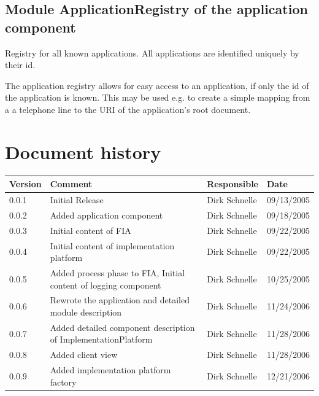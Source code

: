\documentclass[11pt,a4paper]{article}
\begin{document}
\subsection{Module ApplicationRegistry of the application component}

Registry for all known applications. All applications are identified
uniquely by their id.

The application registry allows for easy access to an application,
if only the id of the application is known. This may be used e.g. to
create a simple mapping from a a telephone line to the URI of the
application's root document.


\section*{Document history}

\begin{tabular}{|l|p{5cm}|l|l|}
\hline
\textbf{Version} & \textbf{Comment} & \textbf{Responsible} & \textbf{Date} \\
\hline
\hline
0.0.1 & Initial Release & Dirk Schnelle & 09/13/2005 \\
\hline
0.0.2 & Added application component & Dirk Schnelle & 09/18/2005 \\
\hline
0.0.3 & Initial content of FIA & Dirk Schnelle & 09/22/2005 \\
\hline
0.0.4 & Initial content of implementation platform & Dirk Schnelle & 09/22/2005 \\
\hline
0.0.5 & Added process phase to FIA, Initial content of logging component & 
Dirk Schnelle & 10/25/2005 \\
\hline
0.0.6 & Rewrote the application and detailed module description & 
Dirk Schnelle & 11/24/2006 \\
\hline
0.0.7 & Added detailed component description of ImplementationPlatform & 
Dirk Schnelle & 11/28/2006 \\
\hline
0.0.8 & Added client view & 
Dirk Schnelle & 11/28/2006 \\
\hline
0.0.9 & Added implementation platform factory & 
Dirk Schnelle & 12/21/2006 \\
\hline
\end{tabular}



\end{document}
